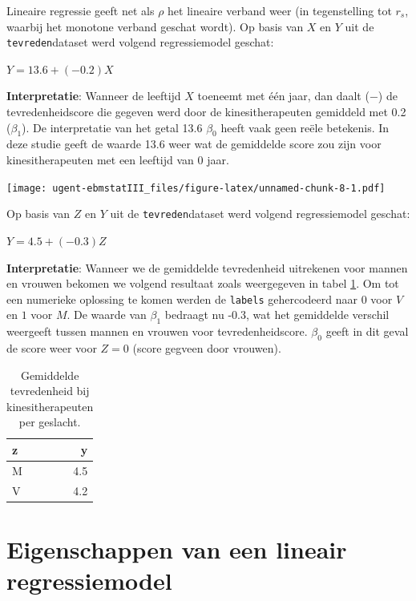 \documentclass[
]{book}
\theoremstyle{definition}
\theoremstyle{definition}
\theoremstyle{definition}
\theoremstyle{definition}
\theoremstyle{remark}
\begin{document}
Lineaire regressie geeft net als \(\rho\) het lineaire verband weer (in tegenstelling tot \(r_s\), waarbij het monotone verband geschat wordt). Op basis van \(X\) en \(Y\) uit de \texttt{tevreden}dataset werd volgend regressiemodel geschat:

\(Y = 13.6 + (-0.2)X\)

\textbf{Interpretatie}: Wanneer de leeftijd \(X\) toeneemt met één jaar, dan daalt (\(-\)) de tevredenheidscore die gegeven werd door de kinesitherapeuten gemiddeld met 0.2 (\(\beta_1\)). De interpretatie van het getal 13.6 \(\beta_0\) heeft vaak geen reële betekenis. In deze studie geeft de waarde 13.6 weer wat de gemiddelde score zou zijn voor kinesitherapeuten met een leeftijd van 0 jaar.

\texttt{[image: ugent-ebmstatIII\_files/figure-latex/unnamed-chunk-8-1.pdf]}

Op basis van \(Z\) en \(Y\) uit de \texttt{tevreden}dataset werd volgend regressiemodel geschat:

\(Y = 4.5 + (-0.3)Z\)

\textbf{Interpretatie}: Wanneer we de gemiddelde tevredenheid uitrekenen voor mannen en vrouwen bekomen we volgend resultaat zoals weergegeven in tabel \ref{tab:tevredenmean}. Om tot een numerieke oplossing te komen werden de \texttt{labels} gehercodeerd naar \(0\) voor \(V\) en \(1\) voor \(M\). De waarde van \(\beta_1\) bedraagt nu -0.3, wat het gemiddelde verschil weergeeft tussen mannen en vrouwen voor tevredenheidscore. \(\beta_0\) geeft in dit geval de score weer voor \(Z=0\) (score gegveen door vrouwen).

\begin{table}

\caption{\label{tab:tevredenmean}Gemiddelde tevredenheid bij kinesitherapeuten per geslacht.}
\centering
\begin{tabular}[t]{lr}
\toprule
z & y\\
\midrule
M & 4.5\\
V & 4.2\\
\bottomrule
\end{tabular}
\end{table}

\hypertarget{eigenschappen-van-een-lineair-regressiemodel}{%
\section*{Eigenschappen van een lineair regressiemodel}\label{eigenschappen-van-een-lineair-regressiemodel}}
\end{document}
